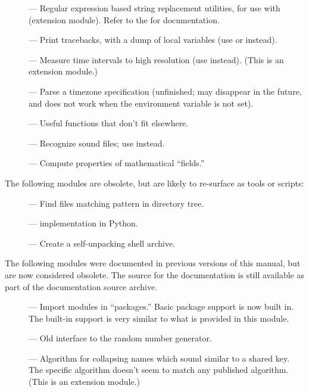 \begin{description}
\item[]
--- Regular expression based string replacement utilities, for use
with  (extension module).  Refer to the
 for documentation.

\item[]
--- Print tracebacks, with a dump of local variables (use
 or  instead).

\item[]
--- Measure time intervals to high resolution (use
 instead).  (This is an extension module.)

\item[]
--- Parse a timezone specification (unfinished; may disappear in the
future, and does not work when the  environment variable is
not set).

\item[]
--- Useful functions that don't fit elsewhere.

\item[]
--- Recognize sound files; use  instead.

\item[]
--- Compute properties of mathematical ``fields.''
\end{description}


The following modules are obsolete, but are likely to re-surface as
tools or scripts:

\begin{description}
\item[]
--- Find files matching pattern in directory tree.

\item[]
---  implementation in Python.

\item[]
--- Create a self-unpacking \UNIX{} shell archive.
\end{description}


The following modules were documented in previous versions of this
manual, but are now considered obsolete.  The source for the
documentation is still available as part of the documentation source
archive.

\begin{description}
\item[]
--- Import modules in ``packages.''  Basic package support is now
built in.  The built-in support is very similar to what is provided in
this module.

\item[]
--- Old interface to the random number generator.

\item[]
--- Algorithm for collapsing names which sound similar to a shared
key.  The specific algorithm doesn't seem to match any published
algorithm.  (This is an extension module.)
\end{description}


